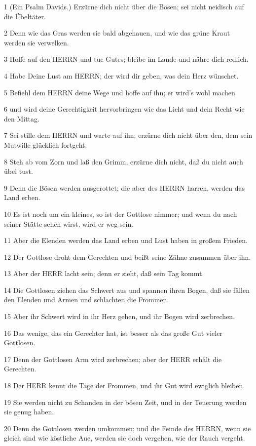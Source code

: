\par 1 (Ein Psalm Davids.) Erzürne dich nicht über die Bösen; sei nicht neidisch auf die Übeltäter.
\par 2 Denn wie das Gras werden sie bald abgehauen, und wie das grüne Kraut werden sie verwelken.
\par 3 Hoffe auf den HERRN und tue Gutes; bleibe im Lande und nähre dich redlich.
\par 4 Habe Deine Lust am HERRN; der wird dir geben, was dein Herz wünschet.
\par 5 Befiehl dem HERRN deine Wege und hoffe auf ihn; er wird's wohl machen
\par 6 und wird deine Gerechtigkeit hervorbringen wie das Licht und dein Recht wie den Mittag.
\par 7 Sei stille dem HERRN und warte auf ihn; erzürne dich nicht über den, dem sein Mutwille glücklich fortgeht.
\par 8 Steh ab vom Zorn und laß den Grimm, erzürne dich nicht, daß du nicht auch übel tust.
\par 9 Denn die Bösen werden ausgerottet; die aber des HERRN harren, werden das Land erben.
\par 10 Es ist noch um ein kleines, so ist der Gottlose nimmer; und wenn du nach seiner Stätte sehen wirst, wird er weg sein.
\par 11 Aber die Elenden werden das Land erben und Lust haben in großem Frieden.
\par 12 Der Gottlose droht dem Gerechten und beißt seine Zähne zusammen über ihn.
\par 13 Aber der HERR lacht sein; denn er sieht, daß sein Tag kommt.
\par 14 Die Gottlosen ziehen das Schwert aus und spannen ihren Bogen, daß sie fällen den Elenden und Armen und schlachten die Frommen.
\par 15 Aber ihr Schwert wird in ihr Herz gehen, und ihr Bogen wird zerbrechen.
\par 16 Das wenige, das ein Gerechter hat, ist besser als das große Gut vieler Gottlosen.
\par 17 Denn der Gottlosen Arm wird zerbrechen; aber der HERR erhält die Gerechten.
\par 18 Der HERR kennt die Tage der Frommen, und ihr Gut wird ewiglich bleiben.
\par 19 Sie werden nicht zu Schanden in der bösen Zeit, und in der Teuerung werden sie genug haben.
\par 20 Denn die Gottlosen werden umkommen; und die Feinde des HERRN, wenn sie gleich sind wie köstliche Aue, werden sie doch vergehen, wie der Rauch vergeht.
